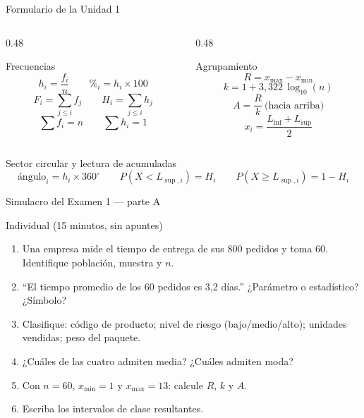 \documentclass[aspectratio=169,10pt]{beamer}
\begin{document}
\begin{frame}{Formulario de la Unidad 1}
  \scriptsize
  \begin{columns}[T,onlytextwidth]
    \begin{column}{0.48\textwidth}
      \begin{block}{Frecuencias}
        \scriptsize
        \[ h_i = \frac{f_i}{n} \qquad \%_i = h_i \times 100 \]
        \[ F_i = \sum_{j\le i} f_j \qquad H_i = \sum_{j\le i} h_j \]
        \[ \sum f_i = n \qquad \sum h_i = 1 \]
      \end{block}
    \end{column}
    \begin{column}{0.48\textwidth}
      \begin{block}{Agrupamiento}
        \scriptsize
        \[ R = x_{\max} - x_{\min} \]
        \[ k = 1 + 3{,}322\,\log_{10}(n) \]
        \[ A = \frac{R}{k} \ \text{(hacia arriba)} \]
        \[ x_i = \frac{L_{\inf}+L_{\sup}}{2} \]
      \end{block}
    \end{column}
  \end{columns}

  \vspace{0.1cm}
  \begin{exampleblock}{Sector circular y lectura de acumuladas}
    \scriptsize
    \[ \text{ángulo}_i = h_i \times 360^\circ \qquad
       P(X < L_{\sup,i}) = H_i \qquad P(X \ge L_{\sup,i}) = 1 - H_i \]
  \end{exampleblock}
\end{frame}

\begin{frame}{Simulacro del Examen 1 — parte A}
  \begin{alertblock}{Individual (15 minutos, sin apuntes)}
    \scriptsize
    \begin{enumerate}\setlength{\itemsep}{-0.05cm}
      \item Una empresa mide el tiempo de entrega de sus 800 pedidos y toma 60.
            Identifique población, muestra y $n$.
      \item ``El tiempo promedio de los 60 pedidos es 3,2 días.''
            ¿Parámetro o estadístico? ¿Símbolo?
      \item Clasifique: código de producto; nivel de riesgo (bajo/medio/alto);
            unidades vendidas; peso del paquete.
      \item ¿Cuáles de las cuatro admiten media? ¿Cuáles admiten moda?
      \item Con $n = 60$, $x_{\min} = 1$ y $x_{\max} = 13$: calcule $R$, $k$ y $A$.
      \item Escriba los intervalos de clase resultantes.
    \end{enumerate}
  \end{alertblock}
\end{frame}
\end{document}
